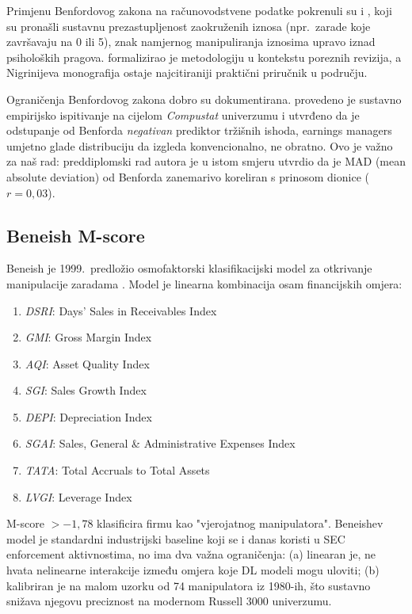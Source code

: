 \documentclass[diplomskirad,authoryear]{fer}
\begin{document}
Primjenu Benfordovog zakona na računovodstvene podatke pokrenuli su \citet{carslaw1988} i \citet{thomas1989}, koji su pronašli sustavnu prezastupljenost zaokruženih iznosa (npr.\ zarade koje završavaju na 0 ili 5), znak namjernog manipuliranja iznosima upravo iznad psiholoških pragova. \citet{nigrini1996} formalizirao je metodologiju u kontekstu poreznih revizija, a Nigrinijeva monografija \citep{nigrini2012} ostaje najcitiraniji praktični priručnik u području.

Ograničenja Benfordovog zakona dobro su dokumentirana. \citet{amiram2015} provedeno je sustavno empirijsko ispitivanje na cijelom \emph{Compustat} univerzumu i utvrđeno da je odstupanje od Benforda \emph{negativan} prediktor tržišnih ishoda, earnings managers umjetno glade distribuciju da izgleda konvencionalno, ne obratno. Ovo je važno za naš rad: preddiplomski rad autora je u istom smjeru utvrdio da je MAD (mean absolute deviation) od Benforda zanemarivo koreliran s prinosom dionice ($r = 0{,}03$).

\subsection{Beneish M-score}

Beneish je 1999.\ predložio osmofaktorski klasifikacijski model za otkrivanje manipulacije zaradama \citep{beneish1999}. Model je linearna kombinacija osam financijskih omjera:
\begin{enumerate}
 \item \emph{DSRI}: Days' Sales in Receivables Index
 \item \emph{GMI}: Gross Margin Index
 \item \emph{AQI}: Asset Quality Index
 \item \emph{SGI}: Sales Growth Index
 \item \emph{DEPI}: Depreciation Index
 \item \emph{SGAI}: Sales, General \& Administrative Expenses Index
 \item \emph{TATA}: Total Accruals to Total Assets
 \item \emph{LVGI}: Leverage Index
\end{enumerate}

M-score $> -1{,}78$ klasificira firmu kao "vjerojatnog manipulatora". Beneishev model je standardni industrijski baseline koji se i danas koristi u SEC enforcement aktivnostima, no ima dva važna ograničenja: (a) linearan je, ne hvata nelinearne interakcije između omjera koje DL modeli mogu uloviti; (b) kalibriran je na malom uzorku od 74 manipulatora iz 1980-ih, što sustavno snižava njegovu preciznost na modernom Russell 3000 univerzumu.
\end{document}
